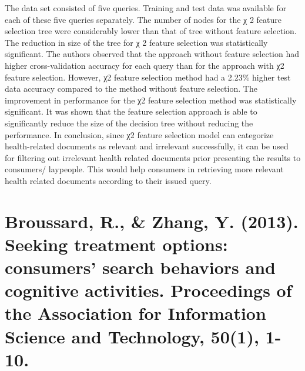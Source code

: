 \documentclass[]{article}
\begin{document}
The data set consisted of five queries. Training and test data was available for each of these five queries separately. The number of nodes for the χ 2 feature selection tree were considerably lower than that of tree without feature selection. The reduction in size of the tree for χ 2 feature selection was statistically significant. The authors observed that the approach without feature selection had higher cross-validation accuracy for each query than for the approach with χ2 feature selection. However, χ2 feature selection method had a 2.23\% higher test data accuracy compared to the method without feature selection. The improvement in performance for the χ2 feature selection method was statistically significant. It was shown that the feature selection approach is able to significantly reduce the size of the decision tree without reducing the performance. In conclusion, since χ2 feature selection model can categorize health-related documents as relevant and irrelevant successfully, it can be used for filtering out irrelevant health related documents prior presenting the results to consumers/ laypeople. This would help consumers in retrieving more relevant health related documents according to their issued query.

\section{Broussard, R., \& Zhang, Y. (2013). Seeking treatment options: consumers' search behaviors and cognitive activities. Proceedings of the Association for Information Science and Technology, 50(1), 1-10.} 
\end{document}
